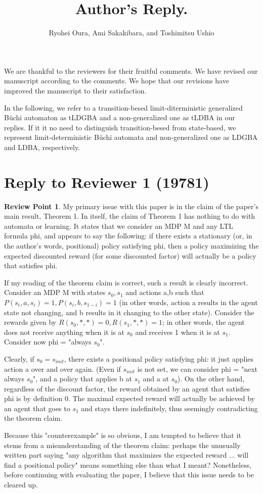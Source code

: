 \documentclass[10 pt, dvipdfmx]{article}
\title{\LARGE \bf
Author's Reply.
}
\author{Ryohei Oura, Ami Sakakibara, and Toshimitsu Ushio}
\theoremstyle{definition}
\newtheorem{review point}{Review Point}[section]
\begin{document}
\maketitle

We are thankful to the reviewers for their fruitful comments. We have revised our
manuscript according to the comments. We hope that our revisions have improved
the manuscript to their satisfaction.

In the following, we refer to a transition-besed limit-diterministic generalized B\"{u}chi automaton as tLDGBA and a non-generalized one as tLDBA in our replies.
If it it no need to distinguish transition-besed from state-based, we represent limit-deterministic B\"{u}chi automata and non-generalized one as LDGBA and LDBA, respectively.

\section{Reply to Reviewer 1 (19781)}

\begin{review point}
  My primary issue with this paper is in the claim of
the paper's main result, Theorem 1. In itself, the claim of Theorem 1
has nothing to do with automata or learning. It states that we consider
an MDP M and any LTL formula phi, and appears to say the following: if
there exists a stationary (or, in the author's words, positional)
policy satisfying phi, then a policy maximizing the expected discounted
reward (for some discounted factor) will actually be a policy that
satisfies phi.

If my reading of the theorem claim is correct, such a result is clearly
incorrect. Consider an MDP M with states {$s_0,s_1$} and actions {a,b}
such that $P(s_i,a,s_i)=1, P(s_i,b,s_{1-i})=1$ (in other words, action a
results in the agent state not changing, and b results in it changing
to the other state). Consider the rewards given by $R(s_0,*,*)=0,
R(s_1,*,*)=1$; in other words, the agent does not receive anything when
it is at $s_0$ and receives 1 when it is at $s_1$. Consider now phi =
"always $s_0$".

Clearly, if $s_0=s_{init}$, there exists a positional policy satisfying
phi: it just applies action a over and over again. (Even if $s_{init}$ is
not set, we can consider phi = "next always $s_0$", and a policy that
applies b at $s_1$ and a at $s_0$). On the other hand, regardless of the
discount factor, the reward obtained by an agent that satisfies phi is
by definition 0. The maximal expected reward will actually be achieved
by an agent that goes to $s_1$ and stays there indefinitely, thus
seemingly contradicting the theorem claim.

Because this "counterexample" is so obvious, I am tempted to believe
that it stems from a misunderstanding of the theorem claim: perhaps the
unusually written part saying "any algorithm that maximizes the
expected reward ... will find a positional policy" means something else
than what I meant? Nonetheless, before continuing with evaluating the
paper, I believe that this issue needs to be cleared up.

\end{review point}
\end{document}

